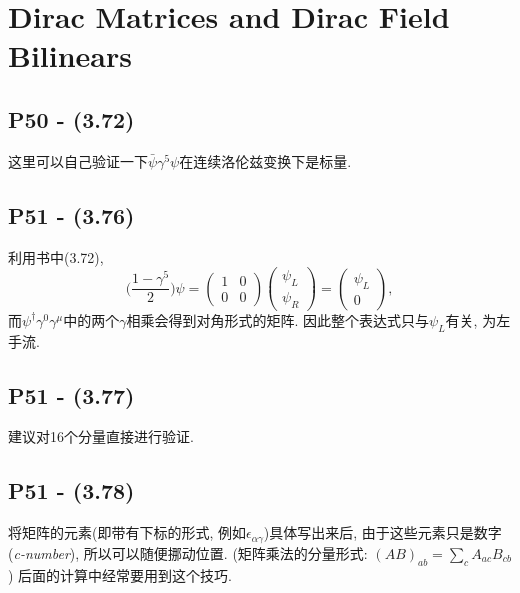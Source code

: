 \section{Dirac Matrices and Dirac Field Bilinears}

\subsection{P50 - (3.72)}

这里可以自己验证一下$\bar{\psi} \gamma^5 \psi$在连续洛伦兹变换下是标量.

\subsection{P51 - (3.76)}

利用书中(3.72),
\begin{equation}
  \biggl( \frac{1 - \gamma^5}{2} \biggr) \psi = \begin{pmatrix}
    1 & 0 \\
    0 & 0
  \end{pmatrix}
  \begin{pmatrix}
    \psi_L \\
    \psi_R
  \end{pmatrix} = \begin{pmatrix}
    \psi_L \\
    0
  \end{pmatrix},
\end{equation}
而$\psi^\dagger \gamma^0 \gamma^\mu$中的两个$\gamma$相乘会得到对角形式的矩阵.
因此整个表达式只与$\psi_L$有关, 为左手流.

\subsection{P51 - (3.77)}

建议对16个分量直接进行验证.

\subsection{P51 - (3.78)}

将矩阵的元素(即带有下标的形式, 例如$\epsilon_{\alpha \gamma}$)具体写出来后, 由于这些元素只是数字(\textit{c-number}), 所以可以随便挪动位置.
(矩阵乘法的分量形式: $(AB)_{ab} = \sum_c A_{ac} B_{cb}$) 后面的计算中经常要用到这个技巧.

